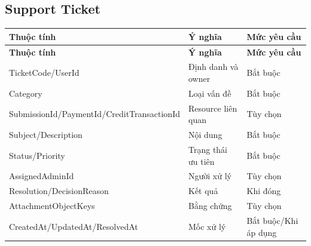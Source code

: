 \documentclass[11pt,a4paper]{article}
\begin{document}
\subsection{Support Ticket}
\small
\setlength{\tabcolsep}{4pt}
\renewcommand{\arraystretch}{1.18}
\begin{longtable}{|P{0.28\textwidth}|P{0.45\textwidth}|P{0.19\textwidth}|}
\hline
\textbf{Thuộc tính} & \textbf{Ý nghĩa} & \textbf{Mức yêu cầu} \\ \hline
\endfirsthead
\hline
\textbf{Thuộc tính} & \textbf{Ý nghĩa} & \textbf{Mức yêu cầu} \\ \hline
\endhead
TicketCode/\allowbreak{}UserId & Định danh và owner & Bắt buộc \\ \hline
Category & Loại vấn đề & Bắt buộc \\ \hline
SubmissionId/\allowbreak{}PaymentId/\allowbreak{}CreditTransactionId & Resource liên quan & Tùy chọn \\ \hline
Subject/\allowbreak{}Description & Nội dung & Bắt buộc \\ \hline
Status/\allowbreak{}Priority & Trạng thái ưu tiên & Bắt buộc \\ \hline
AssignedAdminId & Người xử lý & Tùy chọn \\ \hline
Resolution/\allowbreak{}DecisionReason & Kết quả & Khi đóng \\ \hline
AttachmentObjectKeys & Bằng chứng & Tùy chọn \\ \hline
CreatedAt/\allowbreak{}UpdatedAt/\allowbreak{}ResolvedAt & Mốc xử lý & Bắt buộc/\allowbreak{}Khi áp dụng \\ \hline
\end{longtable}
\normalsize
\end{document}
